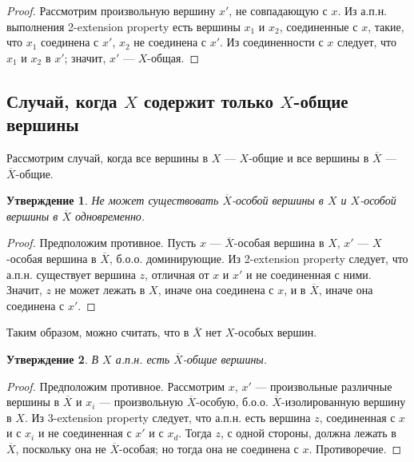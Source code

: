 \documentclass{article}
\newtheorem*{sttm}{Утверждение}
\begin{document}
	\begin{proof}
		Рассмотрим произвольную вершину $x'$, не совпадающую с $x$. Из а.п.н. выполнения 2-extension property есть вершины $x_1$ и $x_2$, соединенные с $x$, такие, что $x_1$ соединена с $x'$, $x_2$ не соединена с $x'$. Из соединенности с $x$ следует, что $x_1$ и $x_2$ в $x'$; значит, $x'$ --- $X$-общая.
	\end{proof}
	
	
	
	\subsection{Случай, когда $X$ содержит только $X$-общие вершины}
	
	Рассмотрим случай, когда все вершины в $X$ --- $X$-общие и все вершины в $\overline{X}$ --- $\overline{X}$-общие.
	
	\begin{sttm}
		Не может существовать $\overline{X}$-особой вершины в $X$ и $X$-особой вершины в $\overline{X}$ одновременно. 
	\end{sttm}
	
	\begin{proof}
		Предположим противное. Пусть $x$ --- $\overline{X}$-особая вершина в $X$, $x'$ --- $X$-особая вершина в $\overline{X}$, б.о.о. доминирующие. Из 2-extension property следует, что а.п.н. существует вершина $z$, отличная от $x$ и $x'$ и не соединенная с ними. Значит, $z$ не может лежать в $X$, иначе она соединена с $x$, и в $\overline{X}$, иначе она соединена с $x'$.
	\end{proof}
	
	Таким образом, можно считать, что в $\overline{X}$ нет $X$-особых вершин.
	
	\begin{sttm}
		В $X$ а.п.н. есть $\overline{X}$-общие вершины.
	\end{sttm}
	
	\begin{proof}
		Предположим противное. Рассмотрим $x$, $x'$ --- произвольные различные вершины в $\overline{X}$ и $x_i$ --- произвольную $\overline{X}$-особую, б.о.о. $\overline{X}$-изолированную вершину в $X$. Из 3-extension property следует, что а.п.н. есть вершина $z$, соединенная с $x$ и с $x_i$ и не соединенная с $x'$ и с $x_d$. Тогда $z$, с одной стороны, должна лежать в $\overline{X}$, поскольку она не $\overline{X}$-особая; но
		тогда она не соединена с $x$. Противоречие.
	\end{proof}
	
\end{document}
